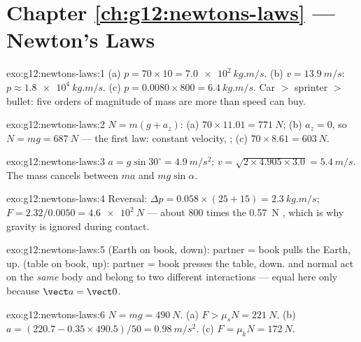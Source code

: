 \section*{Chapter \ref{ch:g12:newtons-laws} --- Newton's Laws}

\begin{solution}{exo:g12:newtons-laws:1}
(a) $p = 70 \times 10 = \qty{7.0e2}{kg.m/s}$.
(b) $v = \qty{13.9}{m/s}$: $p \approx \qty{1.8e4}{kg.m/s}$.
(c) $p = 0.0080 \times 800 = \qty{6.4}{kg.m/s}$. Car $>$ sprinter $>$
bullet: five orders of magnitude of mass are more than speed can buy.
\end{solution}

\begin{solution}{exo:g12:newtons-laws:2}
$N = m(g + a_z)$: (a) $70 \times 11.01 = \qty{771}{N}$;
(b) $a_z = 0$, so $N = mg = \qty{687}{N}$ --- the first law: constant
velocity,  ; (c) $70 \times 8.61 = \qty{603}{N}$.
\end{solution}

\begin{solution}{exo:g12:newtons-laws:3}
$a = g\sin 30^\circ = \qty{4.9}{m/s^2}$;
$v = \sqrt{2 \times 4.905 \times 3.0} = \qty{5.4}{m/s}$. The mass
cancels between $ma$ and $mg\sin\alpha$.
\end{solution}

\begin{solution}{exo:g12:newtons-laws:4}
Reversal: $\Delta p = 0.058 \times (25 + 15) = \qty{2.3}{kg.m/s}$;
$F = 2.32/0.0050 = \qty{4.6e2}{N}$ --- about $800$ times the
\qty{0.57}{N} , which is why gravity is ignored during contact.
\end{solution}

\begin{solution}{exo:g12:newtons-laws:5}
 (Earth on book, down): partner = book pulls the Earth, up.
 (table on book, up): partner = book presses the table,
down.  and normal act on the \emph{same} body and belong to two
different interactions --- equal here only because $\vect a = \vect 0$.
\end{solution}

\begin{solution}{exo:g12:newtons-laws:6}
$N = mg = \qty{490}{N}$. (a) $F > \mu_s N = \qty{221}{N}$.
(b) $a = (220.7 - 0.35 \times 490.5)/50 = \qty{0.98}{m/s^2}$.
(c) $F = \mu_k N = \qty{172}{N}$.
\end{solution}

